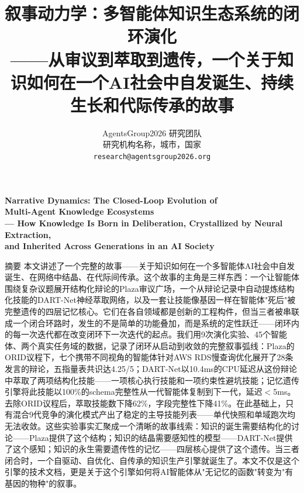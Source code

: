 \documentclass[twocolumn,10.5pt]{ctexart}
\begin{document}
\title{\heiti 叙事动力学：多智能体知识生态系统的闭环演化\\[4pt]
       {\kaishu ——从审议到萃取到遗传，一个关于知识如何在一个AI社会中\linebreak 自发诞生、持续生长和代际传承的故事}}
\author{
   AgentsGroup2026 研究团队 \\[4pt]
   研究机构名称，城市，国家 \\[2pt]
   \texttt{research@agentsgroup2026.org}
}
\date{}
\maketitle

\begin{center}
  {\bfseries Narrative Dynamics: The Closed-Loop Evolution of\\
  Multi-Agent Knowledge Ecosystems\\[2pt]
  \kaishu --- How Knowledge Is Born in Deliberation, Crystallized by Neural Extraction,\\
  and Inherited Across Generations in an AI Society}
\end{center}

{\heiti 摘要 \quad}
{\kaishu
本文讲述了一个完整的故事——关于知识如何在一个多智能体AI社会中自发诞生、在网络中结晶、在代际间传承。这个故事的主角是三样东西：一个让智能体围绕复杂议题展开结构化辩论的Plaza审议广场，一个从辩论记录中自动提炼结构化技能的DART-Net神经萃取网络，以及一套让技能像基因一样在智能体"死后"被完整遗传的四层记忆核心。它们在各自领域都是创新的工程构件，但当三者被串联成一个闭合环路时，发生的不是简单的功能叠加，而是系统的定性跃迁——闭环内的每一次迭代都在改变闭环下一次迭代的起点。我们用9次演化实验、45个智能体、两个真实任务域的数据，记录了闭环从启动到收敛的完整叙事弧线：Plaza的ORID议程下，七个携带不同视角的智能体针对AWS RDS慢查询优化展开了28条发言的辩论，五指量表共识达4.25/5；DART-Net以10.4ms的CPU延迟从这份辩论中萃取了两项结构化技能——一项核心执行技能和一项约束性避坑技能；记忆遗传引擎将此技能以100\%的schema完整性从一代智能体复制到下一代，延迟$<$5ms。去除ORID议程后，萃取技能数下降62\%，字段完整性下降41\%。在此基础上，只有混合9代竞争的演化模式产出了稳定的主导技能列表——单代快照和单域跑次均无法收敛。这些实验事实汇聚成一个清晰的故事线索：知识的诞生需要结构化的讨论——Plaza提供了这个结构；知识的结晶需要感知性的模型——DART-Net提供了这个感知；知识的永生需要遗传性的记忆——四层核心提供了这个遗传。当三者闭合时，一个自驱动、自优化、自传承的知识生产引擎就诞生了。本文不仅是这个引擎的技术文档，更是关于这个引擎如何将AI智能体从"无记忆的函数"转变为"有基因的物种"的叙事。
}
\end{document}
